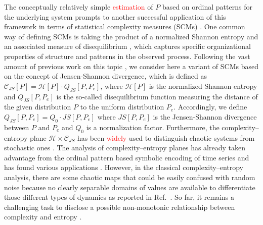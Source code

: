 \documentclass[aip,cha,reprint,nofootinbib]{revtex4-1}
\begin{document}
The conceptually relatively simple \textcolor{red}{estimation} of $P$ based on ordinal patterns for the underlying system prompts to another successful application of this framework in terms of statistical complexity measures (SCMs) \cite{kowalskiEntropy2011}. One common way of defining SCMs is taking the product of a normalized Shannon entropy and an associated measure of disequilibrium \cite{LopezPLA1995,kowalskiEntropy2011}, which captures specific organizational properties of structure and patterns in the observed process. Following the vast amount of previous work on this topic  \cite{rossoPRL2007,LopezPLA1995,kowalskiEntropy2011,Lange2013}, we consider here a variant of SCMs based on the concept of Jensen-Shannon divergence, which is defined as $\mathcal{C}_{JS}[P] = \mathcal{H}[P] \cdot  Q_{JS}[P, P_e]$, where $\mathcal{H}[P]$ is the normalized Shannon entropy and $Q_{JS}[P, P_e]$ is the so-called disequilibrium function measuring the distance of the given distribution $P$ to the uniform distribution $P_e$. Accordingly, we define $Q_{JS}[P, P_e] = Q_{0} \cdot JS[P, P_e]$ where $JS[P, P_e]$ is the Jensen-Shannon divergence between $P$ and $P_e$ and $Q_{0}$ is a normalization factor. Furthermore, the complexity--entropy plane $\mathcal{H} \times \mathcal{C}_{JS}$ has been \textcolor{red}{widely} used to distinguish chaotic systems from stochastic ones \cite{rossoPRL2007}. The analysis of complexity--entropy planes has already taken advantage from the ordinal pattern based symbolic encoding of time series and has found various applications \cite{rossoPRL2007,kowalskiEntropy2011}. However, in the classical complexity--entropy analysis, there are some chaotic maps that could be easily confused with random noise because no clearly separable domains of values are available to differentiate those different types of dynamics as reported in Ref.~\cite{BorgesAMC2019}. So far, it remains a challenging task to disclose a possible non-monotonic relationship between complexity and entropy \cite{MartinPLA2003}. 
\end{document}
